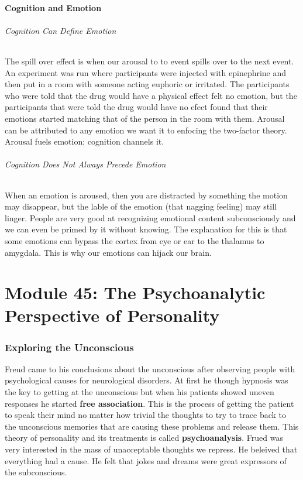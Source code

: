 \documentclass[12pt]{article}
\begin{document}
\subsection*{Cognition and Emotion} 
\paragraph*{Cognition Can Define Emotion} The spill over effect is when our arousal to to event spills over to the next event. An experiment was run where participants were injected with epinephrine and then put in a room with someone acting euphoric or irritated. The participants who were told that the drug would have a physical effect felt no emotion, but the participants that were told the drug would have no efect found that their emotions started matching that of the person in the room with them. Arousal can be attributed to any emotion we want it to enfocing the two-factor theory. Arousal fuels emotion; cognition channels it.
\paragraph*{Cognition Does Not Always Precede Emotion} When an emotion is aroused, then you are distracted by something the motion may disappear, but the lable of the emotion (that nagging feeling) may still linger. People are very good at recognizing emotional content subconsciously and we can even be primed by it without knowing. The explanation for this is that some emotions can bypass the cortex from eye or ear to the thalamus to amygdala. This is why our emotions can hijack our brain. 

\part*{Module 45: The Psychoanalytic Perspective of Personality}
\section*{Exploring the Unconscious}
Freud came to his conclusions about the unconscious after observing people with psychological causes for neurological disorders. At first he though hypnosis was the key to getting at the unconscious but when his patients showed uneven responses he started \textbf{free association}. This is the process of getting the patient to speak their mind no matter how trivial the thoughts to try to trace back to the unconscious memories that are causing these problems and release them. This theory of personality and its treatments is called \textbf{psychoanalysis}. Frued was very interested in the mass of unacceptable thoughts we repress. He beleived that everything had a cause. He felt that jokes and dreams were great expressors of the subconscious. 
\end{document}
